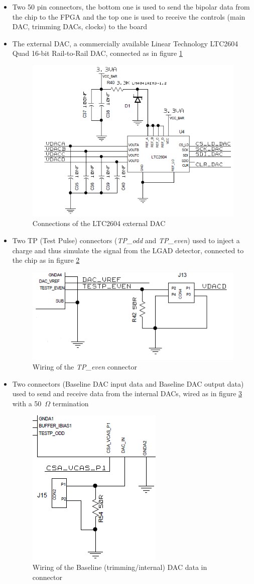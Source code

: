 \begin{itemize}
	\item Two 50 pin connectors, the bottom one is used to send the bipolar data from the chip to the FPGA and the top one is used to receive the controls (main DAC, trimming DACs, clocks) to the board
	\item The external DAC, a commercially available Linear Technology LTC2604 \cite{LTC2604} Quad 16-bit Rail-to-Rail DAC, connected as in figure \ref{fig:externaldac}
	\begin{figure}[H]
		\centering
		\includegraphics[width=0.3\linewidth]{IMG/ch5/EXTERNALDAC}
		\caption{Connections of the LTC2604 external DAC}
		\label{fig:externaldac}
	\end{figure}
	\item Two TP (Test Pulse) connectors (\textit{TP\_odd} and \textit{TP\_even}) used to inject a charge and thus simulate the signal from the LGAD detector, connected to the chip as in figure \ref{fig:tpconnector}
	\begin{figure}[H]
		\centering
		\includegraphics[width=0.4\linewidth]{IMG/ch5/TPCONNECTOR}
		\caption{Wiring of the \textit{TP\_even} connector}
		\label{fig:tpconnector}
	\end{figure}
	\item Two connectors (Baseline DAC input data and Baseline DAC output data) used to send and receive data from the internal DACs, wired as in figure \ref{fig:internaldacwiring} with a 50~$\Omega$ termination 
	\begin{figure}[H]
		\centering
		\includegraphics[width=0.2\linewidth]{IMG/ch5/INTERNALDACWIRING}
		\caption{Wiring of the Baseline (trimming/internal) DAC data in connector}
		\label{fig:internaldacwiring}
	\end{figure} 
\end{itemize} 

